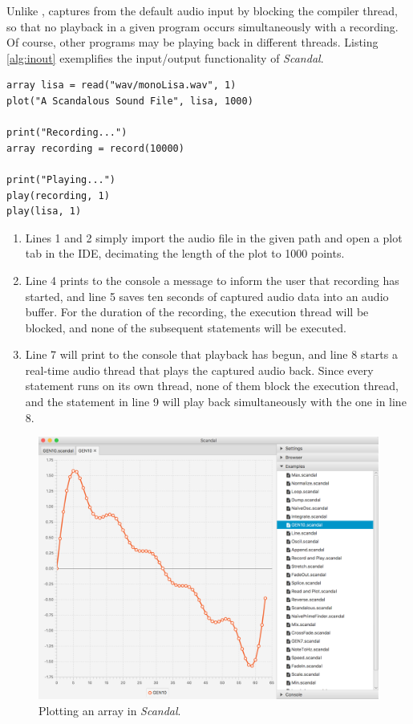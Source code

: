 Unlike ,  captures from the default audio input by blocking the compiler thread, so that no playback in a given program occurs simultaneously with a recording. Of course, other programs may be playing back in different threads. Listing \ref{alg:inout} exemplifies the input/output functionality of \emph{Scandal}. %

\begin{lstlisting}[emph={array,read,string,plot,print,record,play,import},emphstyle={\textbf},caption={Inputting and outputting in \emph{Scandal}},label={alg:inout}]
array lisa = read("wav/monoLisa.wav", 1)
plot("A Scandalous Sound File", lisa, 1000)

print("Recording...")
array recording = record(10000)

print("Playing...")
play(recording, 1)
play(lisa, 1)
\end{lstlisting}

\begin{enumerate}
	\item Lines 1 and 2 simply import the audio file in the given path and open a plot tab in the IDE, decimating the length of the plot to 1000 points.
	\addtocounter{enumi}{2}
	\item Line 4 prints to the console a message to inform the user that recording has started, and line 5 saves ten seconds of captured audio data into an audio buffer. For the duration of the recording, the execution thread will be blocked, and none of the subsequent statements will be executed.
	\addtocounter{enumi}{2}
	\item Line 7 will print to the console that playback has begun, and line 8 starts a real-time audio thread that plays the captured audio back. Since every  statement runs on its own thread, none of them block the execution thread, and the statement in line 9 will play back simultaneously with the one in line 8.
\end{enumerate}

\begin{figure}[p]
	\includegraphics[width=4.5in]{img/plot}
	\caption[Plotting an array in \emph{Scandal}.]{Plotting an array in \emph{Scandal}.}
\end{figure}

